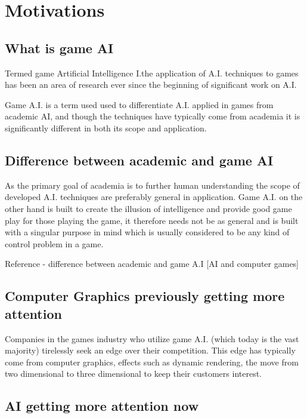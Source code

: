 \documentclass[parskip]{cs4rep}
\begin{document}
\section{Motivations}

\subsection{What is game AI}

Termed game Artificial Intelligence I.the application of A.I. techniques to games has been an area of research ever since the beginning of significant work on A.I. 

Game A.I. is a term used used to differentiate A.I. applied in games from academic AI, and though the techniques have typically come from academia it is significantly different in both its scope and application.

\subsection{Difference between academic and game AI}

As the primary goal of academia is to further human understanding the scope of developed A.I. techniques are preferably general in application. Game A.I. on the other hand is built to create the illusion of intelligence and provide good game play for those playing the game, it therefore needs not be as general and is built with a singular purpose in mind which is usually considered to be any kind of control problem in a game.

Reference - difference between academic and game A.I [AI and computer games]

\subsection{Computer Graphics previously getting more attention}

Companies in the games industry who utilize game A.I. (which today is the vast majority) tirelessly seek an edge over their competition. This edge has typically come from computer graphics, effects such as dynamic rendering, the move from two dimensional to three dimensional to keep their customers interest. 

\subsection{AI getting more attention now}
\end{document}
